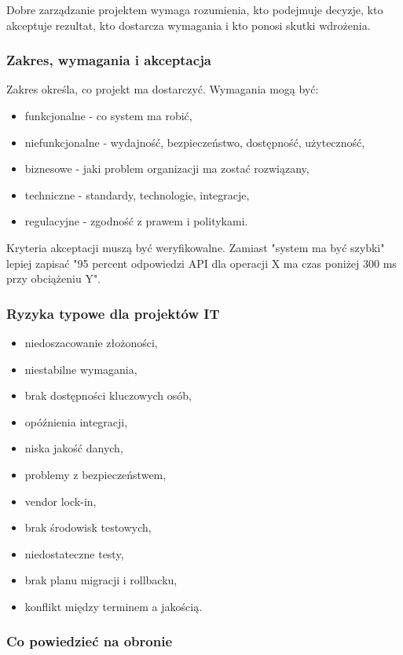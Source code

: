 Dobre zarządzanie projektem wymaga rozumienia, kto podejmuje decyzje, kto akceptuje rezultat, kto dostarcza wymagania i kto ponosi skutki wdrożenia.

\subsubsection{Zakres, wymagania i akceptacja}

Zakres określa, co projekt ma dostarczyć. Wymagania mogą być:
\begin{itemize}
  \item funkcjonalne - co system ma robić,
  \item niefunkcjonalne - wydajność, bezpieczeństwo, dostępność, użyteczność,
  \item biznesowe - jaki problem organizacji ma zostać rozwiązany,
  \item techniczne - standardy, technologie, integracje,
  \item regulacyjne - zgodność z prawem i politykami.
\end{itemize}

Kryteria akceptacji muszą być weryfikowalne. Zamiast "system ma być szybki" lepiej zapisać "95 percent odpowiedzi API dla operacji X ma czas poniżej 300 ms przy obciążeniu Y".

\subsubsection{Ryzyka typowe dla projektów IT}

\begin{itemize}
  \item niedoszacowanie złożoności,
  \item niestabilne wymagania,
  \item brak dostępności kluczowych osób,
  \item opóźnienia integracji,
  \item niska jakość danych,
  \item problemy z bezpieczeństwem,
  \item vendor lock-in,
  \item brak środowisk testowych,
  \item niedostateczne testy,
  \item brak planu migracji i rollbacku,
  \item konflikt między terminem a jakością.
\end{itemize}

\subsubsection{Co powiedzieć na obronie}

